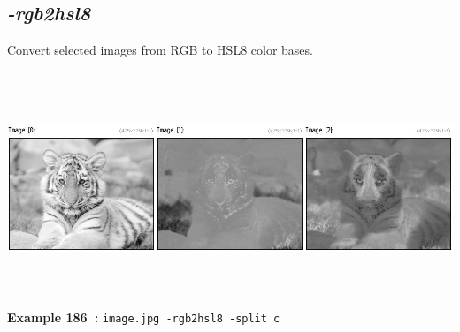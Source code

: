\documentclass[a4paper,11pt,twoside]{book}
\begin{document}
\subsection{\emph{-rgb2hsl8} }\vspace*{-0.5em}
Convert selected images from RGB to HSL8 color bases.
\begin{center}\includegraphics[keepaspectratio=true,height=7cm,width=\textwidth]{img/gmic_def186.jpg}\\
{\footnotesize \textbf{Example 186~:} \texttt{image.jpg -rgb2hsl8 -split c}}
\end{center}
\end{document}
